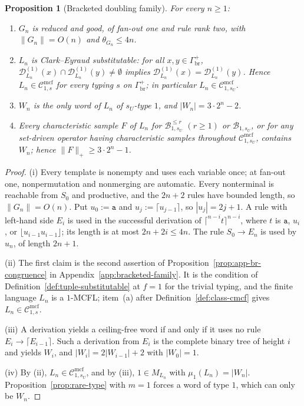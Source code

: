 \documentclass[11pt]{article}
\numberwithin{equation}{section}
\theoremstyle{plain}
\newtheorem{proposition}[theorem]{Proposition}
\theoremstyle{definition}
\theoremstyle{remark}
\newcommand{\Cmcf}[2]{\mathcal{C}^{\mathrm{mcf}}_{#1,#2}}
\newcommand{\D}{\mathcal{D}}
\begin{document}
\begin{proposition}[Bracketed doubling family]
\label{prop:bracketed-family}
For every $n\ge1$:
\begin{enumerate}[label=\textup{(\roman*)},leftmargin=*]
\item $G_n$ is reduced and good, of fan-out one and rule rank two, with
$\|G_n\|=O(n)$ and $\theta_{G_n}\le4n$.
\item $L_n$ is Clark--Eyraud substitutable: for all
$x,y\in\Gamma_{\mathrm{br}}^+$,
$\D^{(1)}_{L_n}(x)\cap\D^{(1)}_{L_n}(y)\ne\emptyset$ implies
$\D^{(1)}_{L_n}(x)=\D^{(1)}_{L_n}(y)$. Hence $L_n\in\Cmcf{1}{s}$ for every
typing $s$ on $\Gamma_{\mathrm{br}}^+$; in particular
$L_n\in\Cmcf{1}{s_U}$.
\item $W_n$ is the only word of $L_n$ of $s_U$-type $1$, and
$|W_n|=3\cdot2^n-2$.
\item Every characteristic sample $F$ of $L_n$ for
$\mathcal B^{\le r}_{1,s_U}$ $(r\ge1)$ or $\mathcal B_{1,s_U}$, or for any
set-driven operator having characteristic samples throughout
$\Cmcf{1}{s_U}$, contains $W_n$; hence $\|F\|_+\ge3\cdot2^n-1$.
\end{enumerate}
\end{proposition}

\begin{proof}
(i) Every template is nonempty and uses each variable once; at fan-out
one, nonpermutation and nonmerging are automatic. Every nonterminal is
reachable from $S_0$ and productive, and the $2n+2$ rules have bounded
length, so $\|G_n\|=O(n)$. Put $u_0:=\mathtt a$ and
$u_j:=\lceil u_{j-1}\rceil$, so $|u_j|=2j+1$. A rule with left-hand side
$E_i$ is used in the successful derivation of
$\lceil^{n-i}t\rceil^{n-i}$, where $t$ is $\mathtt a$, $u_i$, or
$\lfloor u_{i-1}u_{i-1}\rfloor$; its length is at most $2n+2i\le4n$.
The rule $S_0\to E_n$ is used by $u_n$, of length $2n+1$.

(ii) The first claim is the second assertion of
Proposition~\ref{prop:app-br-congruence} in Appendix~\ref{app:bracketed-family}. It is the condition of
Definition~\ref{def:tuple-substitutable} at $f=1$ for the trivial typing,
and the finite language $L_n$ is a $1$-MCFL; item~(a) after
Definition~\ref{def:class-cmcf} gives $L_n\in\Cmcf{1}{s}$.

(iii) A derivation yields a ceiling-free word if and only if it uses no
rule $E_i\to\lceil E_{i-1}\rceil$. Such a derivation from $E_i$ is the
complete binary tree of height $i$ and yields $W_i$, and
$|W_i|=2|W_{i-1}|+2$ with $|W_0|=1$.

(iv) By (ii), $L_n\in\Cmcf{1}{s_U}$, and by (iii), $1\in M_{L_n}$ with
$\mu_1(L_n)=|W_n|$. Proposition~\ref{prop:rare-type} with $m=1$ forces a
word of type $1$, which can only be $W_n$.
\end{proof}
\end{document}
